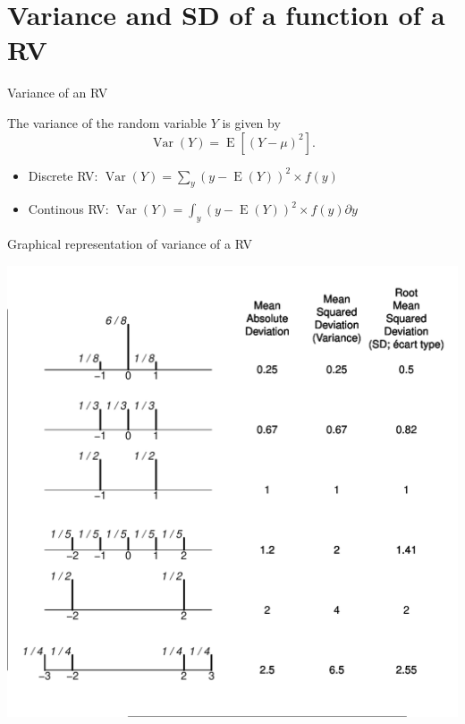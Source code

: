 \documentclass[10pt,handout]{beamer}\usepackage[]{graphicx}\usepackage[]{color}
\newenvironment{knitrout}{}{} %
\newcommand{\Var}{\operatorname{Var}}
\newcommand{\Expec}{\operatorname{E}}
\begin{document}
\section{Variance and SD of a function of a RV}

\begin{frame}{Variance of an RV}
	\begin{definition}
The variance of the random variable $Y$ is given by $$\Var(Y) = \Expec[(Y - \mu)^2].$$ 
\begin{itemize}
	\item Discrete RV: $\Var(Y) = \sum_y (y - \Expec(Y))^2 \times f(y)$
	\item Continous RV: $\Var(Y) = \int_y (y - \Expec(Y))^2 \times f(y) \partial y$
\end{itemize}
	\end{definition}


\end{frame}

\begin{frame}[fragile]{Graphical representation of variance of a RV}
\begin{knitrout}\tiny
{}\color{fgcolor}

{\centering \includegraphics[width=0.85\linewidth]{figure/unnamed-chunk-6-1} 

}


\end{knitrout}
	
\end{frame}
\end{document}
